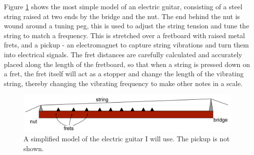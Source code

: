 Figure \ref{fig1} shows the most simple model of an electric guitar, consisting of a steel string raised at two ends by the bridge and the nut. The end behind the nut is wound around a tuning peg, this is used to adjust the string tension and tune the string to match a frequency. This is stretched over a fretboard with raised metal frets, and a pickup - an electromagnet to capture string vibrations and turn them into electrical signals. The fret distances are carefully calculated and accurately placed along the length of the fretboard, so that when a string is pressed down on a fret, the fret itself will act as a stopper and change the length of the vibrating string, thereby changing the vibrating frequency to make other notes in a scale. 
\begin{figure}[!htbp]
    \includegraphics[width=\textwidth]{./ee/fig1.png}
    \caption{A simplified model of the electric guitar I will use. The pickup is not shown.}\label{fig1}
\end{figure} 